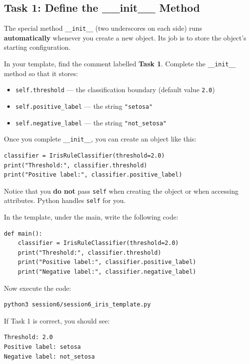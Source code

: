\subsection{Task 1: Define the \_\_init\_\_ Method}

\begin{tcolorbox}[title=Task 1: Define the \_\_init\_\_ Method]
The special method \texttt{\_\_init\_\_} (two underscores on each side) runs \textbf{automatically} whenever you create a new object.
Its job is to store the object's starting configuration.

\medskip
\noindent
In your template, find the comment labelled \textbf{Task 1}.
Complete the \texttt{\_\_init\_\_} method so that it stores:
\begin{itemize}\setlength{\itemsep}{2pt}
    \item \texttt{self.threshold} --- the classification boundary (default value \texttt{2.0})
    \item \texttt{self.positive\_label} --- the string \texttt{"setosa"}
    \item \texttt{self.negative\_label} --- the string \texttt{"not\_setosa"}
\end{itemize}
\end{tcolorbox}

\noindent
Once you complete \texttt{\_\_init\_\_}, you can create an object like this:

\begin{verbatim}
classifier = IrisRuleClassifier(threshold=2.0)
print("Threshold:", classifier.threshold)
print("Positive label:", classifier.positive_label)
\end{verbatim}

\noindent
Notice that you \textbf{do not} pass \texttt{self} when creating the object or when accessing attributes.
Python handles \texttt{self} for you.

\begin{tcolorbox}[title=How to test Task 1 right now]

\noindent
In the template, under the main, write the following code:


\begin{verbatim}
def main():
    classifier = IrisRuleClassifier(threshold=2.0)
    print("Threshold:", classifier.threshold)
    print("Positive label:", classifier.positive_label)
    print("Negative label:", classifier.negative_label)
\end{verbatim}

\noindent
Now execute the code:
\begin{verbatim}
python3 session6/session6_iris_template.py
\end{verbatim}

\noindent
If Task 1 is correct, you should see:
\begin{verbatim}
Threshold: 2.0
Positive label: setosa
Negative label: not_setosa
\end{verbatim}
\end{tcolorbox}

